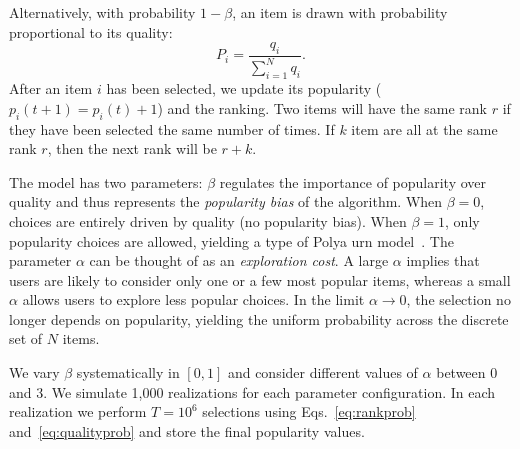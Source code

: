 Alternatively, with probability $1-\beta$, an item is drawn with probability proportional to its quality: 
%
\begin{equation}
P_i = \frac{q_i}{\sum_{i=1}^N q_i}.
\label{eq:qualityprob}
\end{equation}
%
After an item $i$ has been selected, we update its popularity ($p_i(t+1) = p_i(t) + 1$) and the ranking. 
Two items will have the same rank $r$ if they have been selected the same number of times. If $k$ item are all at the same rank $r$, then the next rank will be $r + k$.

The model has two parameters: $\beta$ regulates the importance of popularity over quality and thus represents the \emph{popularity bias} of the algorithm. When $\beta=0$, choices are entirely driven by quality (no popularity bias). When $\beta=1$, only popularity choices are allowed, yielding a type of Polya urn model~\cite{Mahmoud:2008}.
%
The parameter $\alpha$ can be thought of as an \emph{exploration cost}. A large $\alpha$ implies that users are likely to consider only one or a few most popular items, whereas a small $\alpha$ allows users to explore less popular choices. In the limit $\alpha \rightarrow 0$, the selection no longer depends on popularity, yielding the uniform probability across the discrete set of $N$ items.

We vary $\beta$ systematically in $[0,1]$ and consider different values of $\alpha$ between 0 and 3. We simulate 1,000 realizations for each parameter configuration. In each realization we perform $T=10^6$ selections using
Eqs.~\ref{eq:rankprob} and~\ref{eq:qualityprob} 
and store the final popularity values. 


